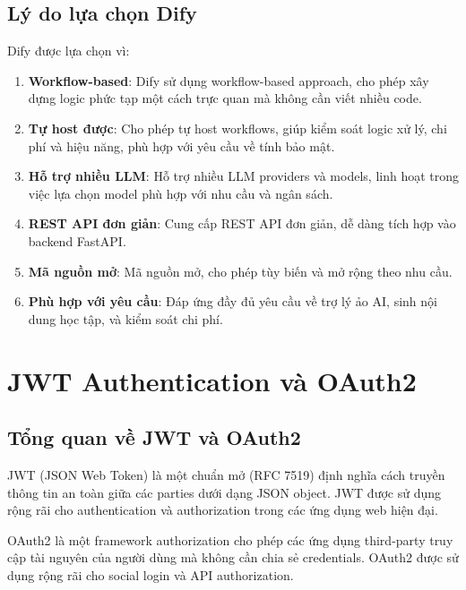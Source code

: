 \documentclass[../DoAn.tex]{subfiles}
\begin{document}
\subsection{Lý do lựa chọn Dify}

Dify được lựa chọn vì:

\begin{enumerate}
    \item \textbf{Workflow-based}: Dify sử dụng workflow-based approach, cho phép xây dựng logic phức tạp một cách trực quan mà không cần viết nhiều code.
    
    \item \textbf{Tự host được}: Cho phép tự host workflows, giúp kiểm soát logic xử lý, chi phí và hiệu năng, phù hợp với yêu cầu về tính bảo mật.
    
    \item \textbf{Hỗ trợ nhiều LLM}: Hỗ trợ nhiều LLM providers và models, linh hoạt trong việc lựa chọn model phù hợp với nhu cầu và ngân sách.
    
    \item \textbf{REST API đơn giản}: Cung cấp REST API đơn giản, dễ dàng tích hợp vào backend FastAPI.
    
    \item \textbf{Mã nguồn mở}: Mã nguồn mở, cho phép tùy biến và mở rộng theo nhu cầu.
    
    \item \textbf{Phù hợp với yêu cầu}: Đáp ứng đầy đủ yêu cầu về trợ lý ảo AI, sinh nội dung học tập, và kiểm soát chi phí.
\end{enumerate}

\section{JWT Authentication và OAuth2}
\label{section:3.6}

\subsection{Tổng quan về JWT và OAuth2}

JWT (JSON Web Token) là một chuẩn mở (RFC 7519) định nghĩa cách truyền thông tin an toàn giữa các parties dưới dạng JSON object. JWT được sử dụng rộng rãi cho authentication và authorization trong các ứng dụng web hiện đại.

OAuth2 là một framework authorization cho phép các ứng dụng third-party truy cập tài nguyên của người dùng mà không cần chia sẻ credentials. OAuth2 được sử dụng rộng rãi cho social login và API authorization.
\end{document}
